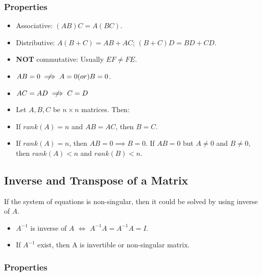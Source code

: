 \subsubsection{Properties}

\begin{itemize}
	\item Associative: $(AB)C = A(BC)$.
	\item Distributive: $A(B+C) = AB + AC$; $(B+C)D = BD + CD$.
	\item \textbf{NOT} commutative: Usually $EF \neq FE$.
	\item $AB = 0 \centernot\implies A=0 \text( or ) B=0$.\\
	\item $AC = AD \centernot\implies C = D$\\
	\item Let $A, B, C$ be $n\times n$ matrices. Then:\\
	\item If $rank(A) = n$ and $AB = AC$, then $B=C$.\\
	\item If $rank(A) = n$, then $AB=0 \implies B = 0$. If $AB = 0$ but $A \neq 0$ and $B \neq 0$, then $rank(A) < n$ and $rank(B) <n$.
\end{itemize}





\subsection{Inverse and Transpose of a Matrix}
If the system of equations is non-singular, then it could be solved by using inverse of $A$.
\begin{itemize}
\item $A^{-1}$ is inverse of $A$ $\Leftrightarrow$ $A^{-1}A = A^{-1}A = I$.
\item If $A^{-1}$ exist, then A is invertible or non-singular matrix.
\end{itemize}

\subsubsection{Properties}

